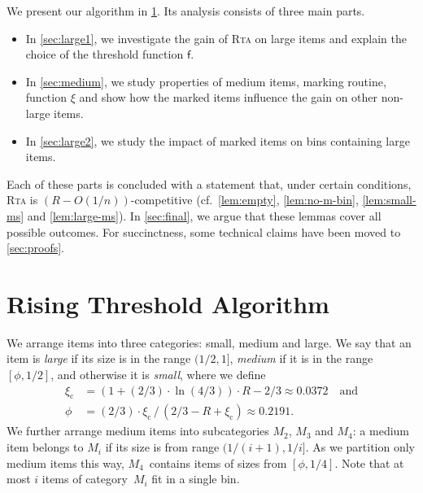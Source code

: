 \documentclass[a4paper,USenglish,cleveref]{lipics-v2019}
\newcommand{\R}{\ensuremath{R}}
\newcommand{\MTI}[1]{\ensuremath{M_{#1}\xspace}}
\newcommand{\smallBoundary}{\ensuremath{\phi}}
\newcommand{\gconst}{\ensuremath{\xi_\mathrm{c}}}
\newcommand{\f}{\textsf{f}}
\newcommand{\g}{\ensuremath{\xi}}
\newcommand{\ALG}{\textsc{Rta}\xspace}
\newcommand\maciek[1]{\texthl{#1}}
\begin{document}
We present our algorithm in \cref{sec:algorithm}. 
Its analysis consists of three main parts. 
\begin{itemize}
\item In \cref{sec:large1}, we investigate the gain of \ALG on large items and explain
the choice of the threshold function $\f$. 
\item In \cref{sec:medium}, we study properties of medium items, marking 
routine, function $\g$ and show how the marked items influence the gain 
on other non-large items. 
\item In \cref{sec:large2}, we study the impact of marked items on 
bins containing large items. 
\end{itemize}
Each of these parts is concluded with a statement that, under certain
conditions, \ALG is $(R-O(1/n))$-competitive (cf.~\cref{lem:empty},
\cref{lem:no-m-bin}, \cref{lem:small-ms} and \cref{lem:large-ms}). In
\cref{sec:final}, we argue that these lemmas cover all possible outcomes. For
succinctness, some technical claims have been moved to \cref{sec:proofs}.



\section{Rising Threshold Algorithm}
\label{sec:algorithm}

We arrange items into three categories: small, medium and large. We say that an
item is \emph{large} if its size is in the range $(1/2,1 ]$, \emph{medium} if it
is in the range $[\smallBoundary, 1/2]$, and otherwise it is \emph{small},
where we define
\begin{align}
  \label{eq:gconst_def}
  \gconst & = (1 + (2/3) \cdot \ln(4/3)) \cdot \R - 2/3 \approx 0.0372 \quad \text{and}  \\
  \label{eq:small_boundary}
  \smallBoundary & = (2/3) \cdot \gconst \,/\, (2/3 - \R + \gconst) \approx 0.2191.
\end{align}
We further arrange medium items into subcategories $\MTI{2}$, $\MTI{3}$ and
$\MTI{4}$: a medium item belongs to $\MTI{i}$ if its size is from range
$(1/(i+1), 1/i]$. As we partition only medium items this way, $\MTI{4}$~contains
\maciek{only} items of sizes from $[\smallBoundary, 1/4]$. Note that at most $i$ items of
category~$\MTI{i}$ fit in a single bin. 
\end{document}
